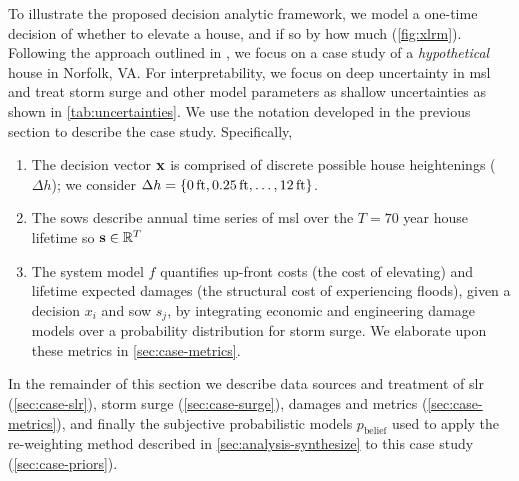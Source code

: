 \documentclass{agujournal2019}
\begin{document}
To illustrate the proposed decision analytic framework, we model a one-time decision of whether to elevate a house, and if so by how much (\cref{fig:xlrm}).
Following the approach outlined in , we focus on a case study of a \emph{hypothetical} house in Norfolk, VA.
For interpretability, we focus on deep uncertainty in \gls{msl} and treat storm surge and other model parameters as shallow uncertainties as shown in \cref{tab:uncertainties}.
We use the notation developed in the previous section to describe the case study.
Specifically,
\begin{enumerate}
  \item The decision vector $\vb{x}$ is comprised of discrete possible house heightenings ($\Delta h$); we consider $\Delta h = \qty{\SI{0}{ft}, \SI{0.25}{ft}, \ldots, \SI{12}{ft}}$.
  \item The \glspl{sow} describe annual time series of \gls{msl} over the $T=70$ year house lifetime so $\vb{s} \in \mathbb{R}^T$
  \item The system model $f$ quantifies up-front costs (the cost of elevating) and lifetime expected damages (the structural cost of experiencing floods), given a decision $x_i$ and \gls{sow} $s_j$, by integrating economic and engineering damage models over a probability distribution for storm surge. We elaborate upon these metrics in \cref{sec:case-metrics}.
\end{enumerate}
In the remainder of this section we describe data sources and treatment of \gls{slr} (\cref{sec:case-slr}), storm surge (\cref{sec:case-surge}), damages and metrics (\cref{sec:case-metrics}), and finally the subjective probabilistic models $p_\mathrm{belief}$ used to apply the re-weighting method described in \cref{sec:analysis-synthesize} to this case study (\cref{sec:case-priors}).
\end{document}

